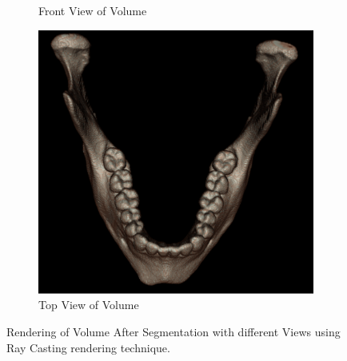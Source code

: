 \documentclass[11.5pt, b5paper]{article}
\begin{document}
\begin{figure}
\begin{subfigure}[b]{0.33\textwidth}
        \caption{Front View of Volume}
    \end{subfigure}
      \hfill
    \begin{subfigure}[b]{0.33\textwidth}
        \centering
        \includegraphics[width=\textwidth]{RCT}
        \caption{Top View of Volume}
    \end{subfigure}
    \caption{Rendering of Volume After Segmentation with different Views using  Ray Casting rendering technique.}
    \label{fig:RC}
\end{figure}
\end{document}
